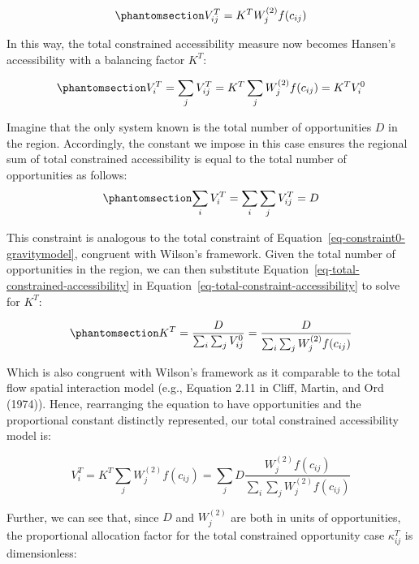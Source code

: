\documentclass[
]{article}
\begin{document}
\begin{equation}\phantomsection\label{eq-total-constrained-access}{
V^T_{ij} = K^T  W_j^{(2)}  f(c_{ij})
}\end{equation}

In this way, the total constrained accessibility measure now becomes
Hansen's accessibility with a balancing factor \(K^T\):

\begin{equation}\phantomsection\label{eq-total-constrained-accessibility}{
V^T_i = \sum_j V^T_{ij} = K^T \sum_j W^{(2)}_jf(c_{ij}) = K^T  V^0_i
}\end{equation}

Imagine that the only system known is the total number of opportunities
\(D\) in the region. Accordingly, the constant we impose in this case
ensures the regional sum of total constrained accessibility is equal to
the total number of opportunities as follows:
\begin{equation}\phantomsection\label{eq-total-constraint-accessibility}{
\sum_i V^T_{i} = \sum_i\sum_j V^T_{ij} = D
}\end{equation}

This constraint is analogous to the total constraint of
Equation~\ref{eq-constraint0-gravitymodel}, congruent with Wilson's
framework. Given the total number of opportunities in the region, we can
then substitute Equation~\ref{eq-total-constrained-accessibility} in
Equation~\ref{eq-total-constraint-accessibility} to solve for \(K^T\):

\begin{equation}\phantomsection\label{eq-total-opportunity-balancing-factor}{
K^T =\frac{D}{\sum_i\sum_j V^0_{ij}} = \frac{D}{\sum_i\sum_j W^{(2)}_jf(c_{ij})}
}\end{equation}

Which is also congruent with Wilson's framework as it comparable to the
total flow spatial interaction model (e.g., Equation 2.11 in Cliff,
Martin, and Ord (1974)). Hence, rearranging the equation to have
opportunities and the proportional constant distinctly represented, our
total constrained accessibility model is:

\[
V^T_i = K^T\sum_j W^{(2)}_jf(c_{ij}) = \sum_j D\frac{W^{(2)}_j f(c_{ij})}{\sum_i\sum_j W^{(2)}_jf(c_{ij})}
\]

Further, we can see that, since \(D\) and \(W^{(2)}_j\) are both in
units of opportunities, the proportional allocation factor for the total
constrained opportunity case \(\kappa_{ij}^T\) is dimensionless:
\end{document}
